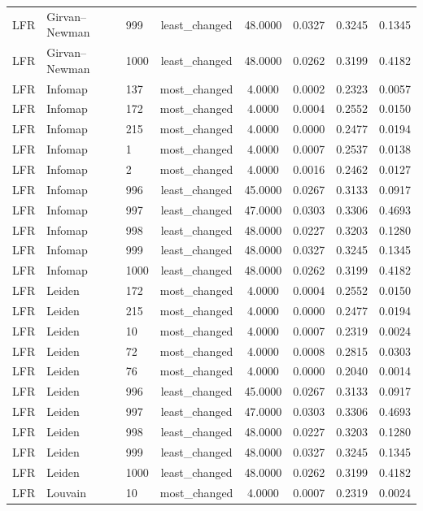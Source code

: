 \begin{longtable}{lllccccc}
LFR & Girvan--Newman & 999 & least\_changed & 48.0000 & 0.0327 & 0.3245 & 0.1345 \\
LFR & Girvan--Newman & 1000 & least\_changed & 48.0000 & 0.0262 & 0.3199 & 0.4182 \\
LFR & Infomap & 137 & most\_changed & 4.0000 & 0.0002 & 0.2323 & 0.0057 \\
LFR & Infomap & 172 & most\_changed & 4.0000 & 0.0004 & 0.2552 & 0.0150 \\
LFR & Infomap & 215 & most\_changed & 4.0000 & 0.0000 & 0.2477 & 0.0194 \\
LFR & Infomap & 1 & most\_changed & 4.0000 & 0.0007 & 0.2537 & 0.0138 \\
LFR & Infomap & 2 & most\_changed & 4.0000 & 0.0016 & 0.2462 & 0.0127 \\
LFR & Infomap & 996 & least\_changed & 45.0000 & 0.0267 & 0.3133 & 0.0917 \\
LFR & Infomap & 997 & least\_changed & 47.0000 & 0.0303 & 0.3306 & 0.4693 \\
LFR & Infomap & 998 & least\_changed & 48.0000 & 0.0227 & 0.3203 & 0.1280 \\
LFR & Infomap & 999 & least\_changed & 48.0000 & 0.0327 & 0.3245 & 0.1345 \\
LFR & Infomap & 1000 & least\_changed & 48.0000 & 0.0262 & 0.3199 & 0.4182 \\
LFR & Leiden & 172 & most\_changed & 4.0000 & 0.0004 & 0.2552 & 0.0150 \\
LFR & Leiden & 215 & most\_changed & 4.0000 & 0.0000 & 0.2477 & 0.0194 \\
LFR & Leiden & 10 & most\_changed & 4.0000 & 0.0007 & 0.2319 & 0.0024 \\
LFR & Leiden & 72 & most\_changed & 4.0000 & 0.0008 & 0.2815 & 0.0303 \\
LFR & Leiden & 76 & most\_changed & 4.0000 & 0.0000 & 0.2040 & 0.0014 \\
LFR & Leiden & 996 & least\_changed & 45.0000 & 0.0267 & 0.3133 & 0.0917 \\
LFR & Leiden & 997 & least\_changed & 47.0000 & 0.0303 & 0.3306 & 0.4693 \\
LFR & Leiden & 998 & least\_changed & 48.0000 & 0.0227 & 0.3203 & 0.1280 \\
LFR & Leiden & 999 & least\_changed & 48.0000 & 0.0327 & 0.3245 & 0.1345 \\
LFR & Leiden & 1000 & least\_changed & 48.0000 & 0.0262 & 0.3199 & 0.4182 \\
LFR & Louvain & 10 & most\_changed & 4.0000 & 0.0007 & 0.2319 & 0.0024 \\

\end{longtable}
